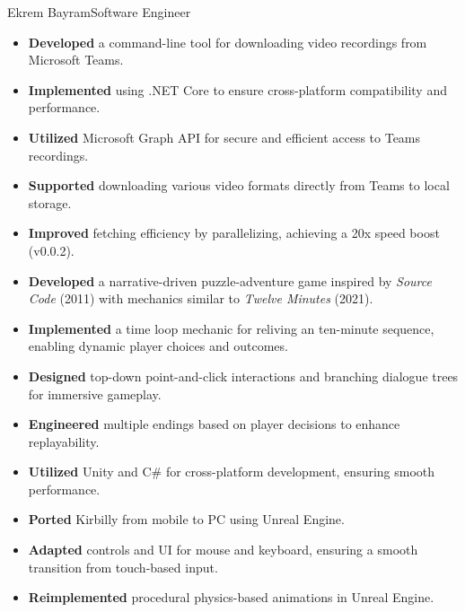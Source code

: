 \documentclass{article}
\begin{document}
\begin{cv}[avatar]{Ekrem Bayram}{Software Engineer}
    \cvseparator[2]
    \begin{cvevent}[2023]
        \begin{itemize}
            \item \textbf{Developed} a command-line tool for downloading video recordings from Microsoft Teams.
            \item \textbf{Implemented} using .NET Core to ensure cross-platform compatibility and performance.
            \item \textbf{Utilized} Microsoft Graph API for secure and efficient access to Teams recordings.
            \item \textbf{Supported} downloading various video formats directly from Teams to local storage.
            \item \textbf{Improved} fetching efficiency by parallelizing, achieving a 20x speed boost (v0.0.2).
        \end{itemize}
    \end{cvevent}

    \cvseparator[2]
    \begin{cvevent}[2023]
        \begin{itemize}
            \item \textbf{Developed} a narrative-driven puzzle-adventure game inspired by \textit{Source Code} (2011) with mechanics similar to \textit{Twelve Minutes} (2021).
            \item \textbf{Implemented} a time loop mechanic for reliving an ten-minute sequence, enabling dynamic player choices and outcomes.
            \item \textbf{Designed} top-down point-and-click interactions and branching dialogue trees for immersive gameplay.
            \item \textbf{Engineered} multiple endings based on player decisions to enhance replayability.
            \item \textbf{Utilized} Unity and C\# for cross-platform development, ensuring smooth performance.
        \end{itemize}
    \end{cvevent}

    \cvseparator[2]
    \begin{cvevent}[2023]
        \begin{itemize}
            \item \textbf{Ported} Kirbilly from mobile to PC using Unreal Engine.
            \item \textbf{Adapted} controls and UI for mouse and keyboard, ensuring a smooth transition from touch-based input.
            \item \textbf{Reimplemented} procedural physics-based animations in Unreal Engine.
        \end{itemize}
    \end{cvevent}


\end{cv}
\end{document}
